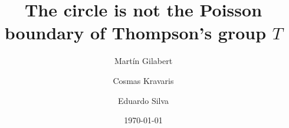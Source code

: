 \documentclass[reqno,oneside,11pt]{amsart}
\author{Martín Gilabert}
\author{Cosmas Kravaris}
\author{Eduardo Silva}
\title[The circle is not the Poisson boundary of Thompson's group $T$ ]{The circle is not the Poisson boundary of Thompson's group $T$}
\date{\today}
\begin{document}
	
	\maketitle
	\begin{abstract}
    
\end{abstract}





%
	
	
	
\end{document}
